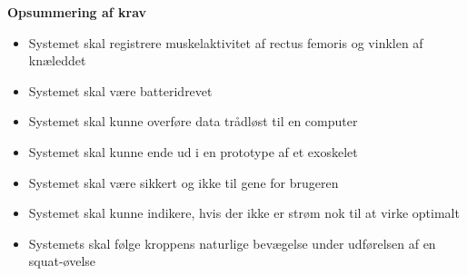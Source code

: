 \vspace{3mm}
\textbf{Opsummering af krav}
\begin{itemize}
\item[\text{\sffamily \checkmark}] Systemet skal registrere muskelaktivitet af rectus femoris og vinklen af knæleddet
\item[\text{\sffamily \checkmark}] Systemet skal være batteridrevet
\item[\text{\sffamily \checkmark}] Systemet skal kunne overføre data trådløst til en computer
\item[\text{\sffamily \checkmark}] Systemet skal kunne ende ud i en prototype af et exoskelet
\item[\text{\sffamily \checkmark}] Systemet skal være sikkert og ikke til gene for brugeren 
\item[\text{\sffamily \checkmark}] Systemet skal kunne indikere, hvis der ikke er strøm nok til at virke optimalt
\item[\text{\sffamily \checkmark}] Systemets skal følge kroppens naturlige bevægelse under udførelsen af en squat-øvelse
\end{itemize}
